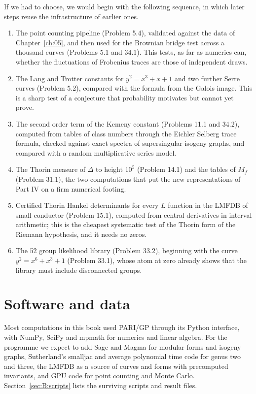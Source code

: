 If we had to choose, we would begin with the following sequence, in which later steps reuse the infrastructure of earlier ones.

\begin{enumerate}
\item The point counting pipeline (Problem 5.4), validated against the data of Chapter~\ref{ch:05}, and then used for the Brownian bridge test across a thousand curves (Problems 5.1 and 34.1). This tests, as far as numerics can, whether the fluctuations of Frobenius traces are those of independent draws.
\item The Lang and Trotter constants for $y^2=x^3+x+1$ and two further Serre curves (Problem 5.2), compared with the formula from the Galois image. This is a sharp test of a conjecture that probability motivates but cannot yet prove.
\item The second order term of the Kemeny constant (Problems 11.1 and 34.2), computed from tables of class numbers through the Eichler Selberg trace formula, checked against exact spectra of supersingular isogeny graphs, and compared with a random multiplicative series model.
\item The Thorin measure of $\Delta$ to height $10^5$ (Problem 14.1) and the tables of $M_f$ (Problem 31.1), the two computations that put the new representations of Part IV on a firm numerical footing.
\item Certified Thorin Hankel determinants for every $L$ function in the LMFDB of small conductor (Problem 15.1), computed from central derivatives in interval arithmetic; this is the cheapest systematic test of the Thorin form of the Riemann hypothesis, and it needs no zeros.
\item The 52 group likelihood library (Problem 33.2), beginning with the curve $y^2=x^6+x^3+1$ (Problem 33.1), whose atom at zero already shows that the library must include disconnected groups.
\end{enumerate}

\section{Software and data}

Most computations in this book used PARI/GP through its Python interface, with NumPy, SciPy and mpmath for numerics and linear algebra. For the programme we expect to add Sage and Magma for modular forms and isogeny graphs, Sutherland's smalljac and average polynomial time code for genus two and three, the LMFDB as a source of curves and forms with precomputed invariants, and GPU code for point counting and Monte Carlo. Section~\ref{sec:B:scripts} lists the surviving scripts and result files.

